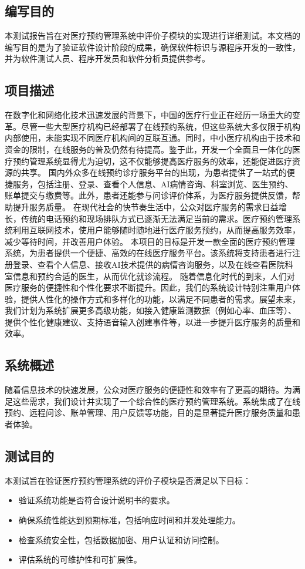 \subsection{编写目的}
本测试报告旨在对医疗预约管理系统中评价子模块的实现进行详细测试。本文档的编写目的是为了验证软件设计阶段的成果，确保软件标识与源程序开发的一致性，并为软件测试人员、程序开发员和软件分析员提供参考。

\subsection{项目描述}
在数字化和网络化技术迅速发展的背景下，中国的医疗行业正在经历一场重大的变革。尽管一些大型医疗机构已经部署了在线预约系统，但这些系统大多仅限于机构内部使用，未能实现不同医疗机构间的互联互通。同时，中小医疗机构由于技术和资金的限制，在线服务的普及仍然有待提高。鉴于此，开发一个全面且一体化的医疗预约管理系统显得尤为迫切，这不仅能够提高医疗服务的效率，还能促进医疗资源的共享。
国内外众多在线预约诊疗服务平台的出现，为患者提供了一站式的便捷服务，包括注册、登录、查看个人信息、AI病情咨询、科室浏览、医生预约、账单提交与缴费等。此外，患者还能参与问诊评价体系，为医疗服务提供反馈，帮助提升服务质量。
在现代社会的快节奏生活中，公众对医疗服务的需求日益增长，传统的电话预约和现场排队方式已逐渐无法满足当前的需求。医疗预约管理系统利用互联网技术，使用户能够随时随地进行医疗服务预约，从而提高服务效率，减少等待时间，并改善用户体验。
本项目的目标是开发一款全面的医疗预约管理系统，为患者提供一个便捷、高效的在线医疗服务平台。该系统将支持患者进行注册登录、查看个人信息、接收AI技术提供的病情咨询服务，以及在线查看医院科室信息和预约合适的医生，从而优化就诊流程。
随着信息化时代的到来，人们对医疗服务的便捷性和个性化要求不断提升。因此，我们的系统设计特别注重用户体验，提供人性化的操作方式和多样化的功能，以满足不同患者的需求。展望未来，我们计划为系统扩展更多高级功能，如接入健康监测数据（例如心率、血压等）、提供个性化健康建议、支持语音输入创建事件等，以进一步提升医疗服务的质量和效率。

\subsection{系统概述}
随着信息技术的快速发展，公众对医疗服务的便捷性和效率有了更高的期待。为满足这些需求，我们设计并实现了一个综合性的医疗预约管理系统。系统集成了在线预约、远程问诊、账单管理、用户反馈等功能，目的是显著提升医疗服务质量和患者体验。

\subsection{测试目的}
本测试旨在验证医疗预约管理系统的评价子模块是否满足以下目标：
\begin{itemize}
	\item 验证系统功能是否符合设计说明书的要求。
	\item 确保系统性能达到预期标准，包括响应时间和并发处理能力。
	\item 检查系统安全性，包括数据加密、用户认证和访问控制。
	\item 评估系统的可维护性和可扩展性。
\end{itemize}

